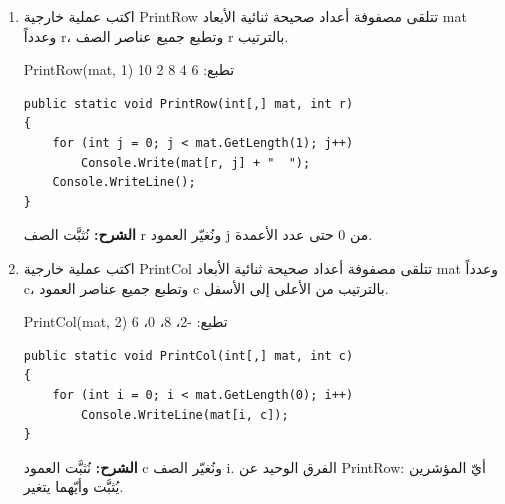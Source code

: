 \documentclass[14pt]{extarticle}
\begin{document}
\begin{enumerate}[itemsep=2em]

\item
اكتب عملية خارجية \textenglish{PrintRow} تتلقى مصفوفة أعداد صحيحة ثنائية الأبعاد \textenglish{mat} وعدداً \textenglish{r}، وتطبع جميع عناصر الصف \textenglish{r} بالترتيب.

\begin{boxExample}
\textenglish{PrintRow(mat, 1)} تطبع: \textenglish{6  4  8  2  10}
\end{boxExample}

\ifwithsols
\begin{boxSolution}
\begin{boxCode}
\begin{english}
\begin{verbatim}
public static void PrintRow(int[,] mat, int r)
{
    for (int j = 0; j < mat.GetLength(1); j++)
        Console.Write(mat[r, j] + "  ");
    Console.WriteLine();
}
\end{verbatim}
\end{english}
\end{boxCode}
\textbf{الشرح:} نُثبَّت الصف \textenglish{r} ونُغيّر العمود \textenglish{j} من 0 حتى عدد الأعمدة.
\end{boxSolution}
\clearpage
\fi

\item
اكتب عملية خارجية \textenglish{PrintCol} تتلقى مصفوفة أعداد صحيحة ثنائية الأبعاد \textenglish{mat} وعدداً \textenglish{c}، وتطبع جميع عناصر العمود \textenglish{c} بالترتيب من الأعلى إلى الأسفل.

\begin{boxExample}
\textenglish{PrintCol(mat, 2)} تطبع: \textenglish{-2}، \textenglish{8}، \textenglish{0}، \textenglish{6}
\end{boxExample}

\ifwithsols
\begin{boxSolution}
\begin{boxCode}
\begin{english}
\begin{verbatim}
public static void PrintCol(int[,] mat, int c)
{
    for (int i = 0; i < mat.GetLength(0); i++)
        Console.WriteLine(mat[i, c]);
}
\end{verbatim}
\end{english}
\end{boxCode}
\textbf{الشرح:} نُثبَّت العمود \textenglish{c} ونُغيّر الصف \textenglish{i}. الفرق الوحيد عن \textenglish{PrintRow}: أيّ المؤشرين يُثبَّت وأيّهما يتغير.
\end{boxSolution}
\clearpage
\fi


\end{enumerate}
\end{document}
